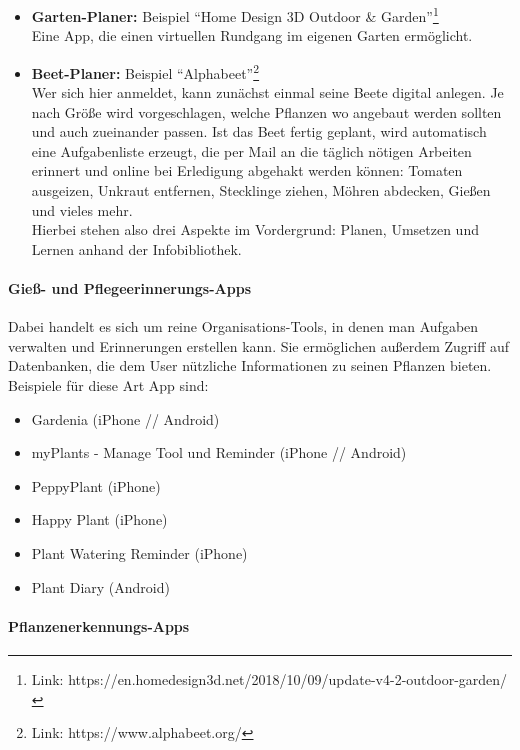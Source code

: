 \begin{itemize}
\item
  \textbf{Garten-Planer:} Beispiel ``Home Design 3D Outdoor \&
  Garden''\footnote{Link:
    https://en.homedesign3d.net/2018/10/09/update-v4-2-outdoor-garden/}\\
  Eine App, die einen virtuellen Rundgang im eigenen Garten ermöglicht.
\item
  \textbf{Beet-Planer:} Beispiel ``Alphabeet''\footnote{Link:
    https://www.alphabeet.org/}\\
  Wer sich hier anmeldet, kann zunächst einmal seine Beete digital
  anlegen. Je nach Größe wird vorgeschlagen, welche Pflanzen wo angebaut
  werden sollten und auch zueinander passen. Ist das Beet fertig
  geplant, wird automatisch eine Aufgabenliste erzeugt, die per Mail an
  die täglich nötigen Arbeiten erinnert und online bei Erledigung
  abgehakt werden können: Tomaten ausgeizen, Unkraut entfernen,
  Stecklinge ziehen, Möhren abdecken, Gießen und vieles mehr.\\
  Hierbei stehen also drei Aspekte im Vordergrund: Planen, Umsetzen und
  Lernen anhand der Infobibliothek.
\end{itemize}

\hypertarget{gieuxdf--und-pflegeerinnerungs-apps}{%
\paragraph{Gieß- und
Pflegeerinnerungs-Apps}\label{gieuxdf--und-pflegeerinnerungs-apps}}

Dabei handelt es sich um reine Organisations-Tools, in denen man
Aufgaben verwalten und Erinnerungen erstellen kann. Sie ermöglichen
außerdem Zugriff auf Datenbanken, die dem User nützliche Informationen
zu seinen Pflanzen bieten.\\
Beispiele für diese Art App sind:

\begin{itemize}
\tightlist
\item
  Gardenia (iPhone // Android)
\item
  myPlants - Manage Tool und Reminder (iPhone // Android)
\item
  PeppyPlant (iPhone)
\item
  Happy Plant (iPhone)
\item
  Plant Watering Reminder (iPhone)
\item
  Plant Diary (Android)
\end{itemize}

\hypertarget{pflanzenerkennungs-apps}{%
\paragraph{Pflanzenerkennungs-Apps}\label{pflanzenerkennungs-apps}}

